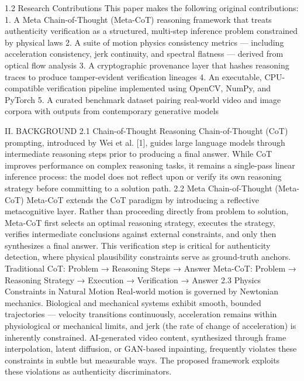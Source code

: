 1.2  Research Contributions
This paper makes the following original contributions:
1.	A Meta Chain-of-Thought (Meta-CoT) reasoning framework that treats authenticity verification as a structured, multi-step inference problem constrained by physical laws
2.	A suite of motion physics consistency metrics — including acceleration consistency, jerk continuity, and spectral flatness — derived from optical flow analysis
3.	A cryptographic provenance layer that hashes reasoning traces to produce tamper-evident verification lineages
4.	An executable, CPU-compatible verification pipeline implemented using OpenCV, NumPy, and PyTorch
5.	A curated benchmark dataset pairing real-world video and image corpora with outputs from contemporary generative models

II.  BACKGROUND
2.1  Chain-of-Thought Reasoning
Chain-of-Thought (CoT) prompting, introduced by Wei et al. [1], guides large language models through intermediate reasoning steps prior to producing a final answer. While CoT improves performance on complex reasoning tasks, it remains a single-pass linear inference process: the model does not reflect upon or verify its own reasoning strategy before committing to a solution path.
2.2  Meta Chain-of-Thought (Meta-CoT)
Meta-CoT extends the CoT paradigm by introducing a reflective metacognitive layer. Rather than proceeding directly from problem to solution, Meta-CoT first selects an optimal reasoning strategy, executes the strategy, verifies intermediate conclusions against external constraints, and only then synthesizes a final answer. This verification step is critical for authenticity detection, where physical plausibility constraints serve as ground-truth anchors.
Traditional CoT:   Problem  →  Reasoning Steps  →  Answer
Meta-CoT:       Problem  →  Reasoning Strategy  →  Execution  →  Verification  →  Answer
2.3  Physics Constraints in Natural Motion
Real-world motion is governed by Newtonian mechanics. Biological and mechanical systems exhibit smooth, bounded trajectories — velocity transitions continuously, acceleration remains within physiological or mechanical limits, and jerk (the rate of change of acceleration) is inherently constrained. AI-generated video content, synthesized through frame interpolation, latent diffusion, or GAN-based inpainting, frequently violates these constraints in subtle but measurable ways. The proposed framework exploits these violations as authenticity discriminators.

